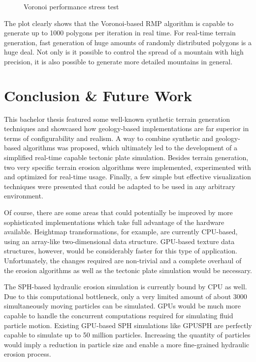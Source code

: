 \documentclass[11pt,a4paper,twoside,openright]{report}
\begin{document}
\begin{figure}[h]
\centering
{}
\caption{Voronoi performance stress test}
\label{fig:voronoiperformancestresstest}
\end{figure}
The plot clearly shows that the Voronoi-based RMP algorithm is capable to generate up to 1000 polygons per iteration in real time. For real-time terrain generation, fast generation of huge amounts of randomly distributed polygons is a huge deal. Not only is it possible to control the spread of a mountain with high precision, it is also possible to generate more detailed mountains in general.

\chapter{Conclusion \& Future Work}
\label{sec:concl}
This bachelor thesis featured some well-known synthetic terrain generation techniques and showcased how geology-based implementations are far superior in terms of configurability and realism. A way to combine synthetic and geology-based algorithms was proposed, which ultimately led to the development of a simplified real-time capable tectonic plate simulation. Besides terrain generation, two very specific terrain erosion algorithms were implemented, experimented with and optimized for real-time usage. Finally, a few simple but effective visualization techniques were presented that could be adapted to be used in any arbitrary environment.

Of course, there are some areas that could potentially be improved by more sophisticated implementations which take full advantage of the hardware available. Heightmap transformations, for example, are currently CPU-based, using an array-like two-dimensional data structure. GPU-based texture data structures, however, would be considerably faster for this type of application. Unfortunately, the changes required are non-trivial and a complete overhaul of the erosion algorithms as well as the tectonic plate simulation would be necessary.

The SPH-based hydraulic erosion simulation is currently bound by CPU as well. Due to this computational bottleneck, only a very limited amount of about 3000 simultaneously moving particles can be simulated. GPUs would be much more capable to handle the concurrent computations required for simulating fluid particle motion. Existing GPU-based SPH simulations like GPUSPH \cite{GPUSPH:2008} are perfectly capable to simulate up to 50 million particles. Increasing the quantity of particles would imply a reduction in particle size and enable a more fine-grained hydraulic erosion process.
\end{document}
